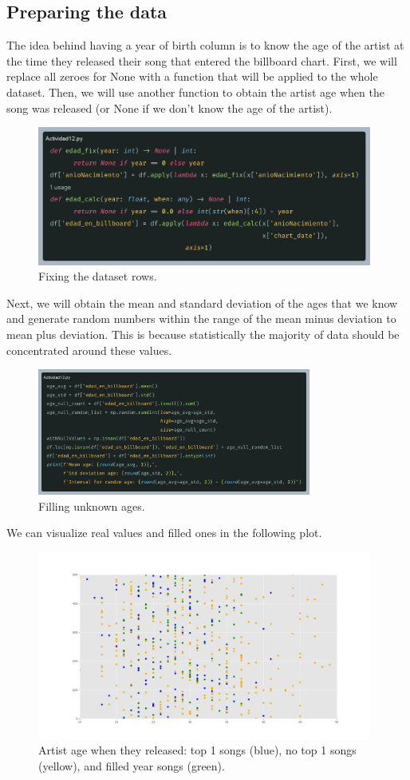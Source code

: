\documentclass[10pt]{article}
\begin{document}
\subsection{Preparing the data}
The idea behind having a year of birth column is to know the age of the artist at the time they released their song that entered the billboard chart. First, we will replace all zeroes for None with a function that will be applied to the whole dataset. Then, we will use another function to obtain the artist age when the song was released (or None if we don't know the age of the artist). \par
\begin{figure}[h]
    \centering
    \includegraphics[width=110mm]{2025-03-30-20-56-30.png}
    \caption{Fixing the dataset rows.}
\end{figure}
Next, we will obtain the mean and standard deviation of the ages that we know and generate random numbers within the range of the mean minus deviation to mean plus deviation. This is because statistically the majority of data should be concentrated around these values. \par
\begin{figure}[h]
    \centering
    \includegraphics[width=90mm]{2025-03-30-21-00-25.png}
    \caption{Filling unknown ages.}
\end{figure}
We can visualize real values and filled ones in the following plot.
\begin{figure}[h]
    \centering
    \includegraphics[width=110mm]{age_in_chart_plot.png}
    \caption{Artist age when they released: top 1 songs (blue), no top 1 songs (yellow), and filled year songs (green).}
\end{figure}
\end{document}
